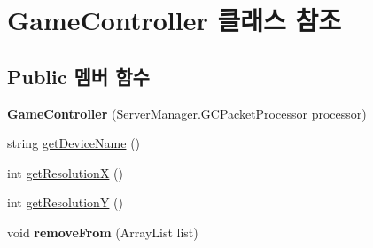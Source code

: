 \hypertarget{class_game_controller}{}\section{Game\+Controller 클래스 참조}
\label{class_game_controller}
\subsection*{Public 멤버 함수}
\begin{DoxyCompactItemize}
\item 
\hypertarget{class_game_controller_afd0153e9695df3d4d82a855e506c2c7e}{}{\bfseries Game\+Controller} (\hyperlink{class_server_manager_1_1_g_c_packet_processor}{Server\+Manager.\+G\+C\+Packet\+Processor} processor)\label{class_game_controller_afd0153e9695df3d4d82a855e506c2c7e}

\item 
string \hyperlink{class_game_controller_a0eba2827c63ded1805248a00dc1c5fbc}{get\+Device\+Name} ()
\item 
int \hyperlink{class_game_controller_a5c2c3c6c03ebadbb8d2a55a71456a000}{get\+Resolution\+X} ()
\item 
int \hyperlink{class_game_controller_a0de572d9e92f8a09700841f2534629f6}{get\+Resolution\+Y} ()
\item 
\hypertarget{class_game_controller_a44c5358ebeb88a43780c6c05cef4674d}{}void {\bfseries remove\+From} (Array\+List list)\label{class_game_controller_a44c5358ebeb88a43780c6c05cef4674d}


\end{DoxyCompactItemize}
